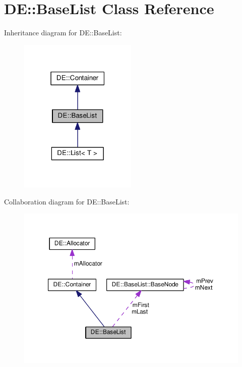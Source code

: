 \hypertarget{classDE_1_1BaseList}{}\section{DE\+:\+:Base\+List Class Reference}
\label{classDE_1_1BaseList}


Inheritance diagram for DE\+:\+:Base\+List\+:
\nopagebreak
\begin{figure}[H]
\begin{center}
\leavevmode
\includegraphics[width=159pt]{classDE_1_1BaseList__inherit__graph}
\end{center}
\end{figure}


Collaboration diagram for DE\+:\+:Base\+List\+:
\nopagebreak
\begin{figure}[H]
\begin{center}
\leavevmode
\includegraphics[width=350pt]{classDE_1_1BaseList__coll__graph}
\end{center}
\end{figure}

